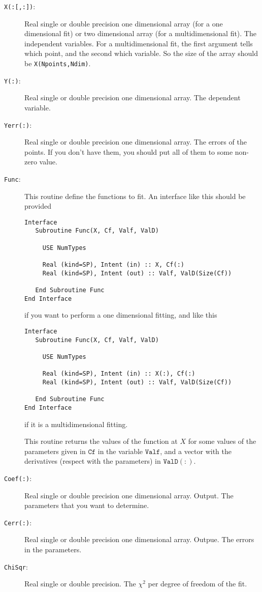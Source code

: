 \begin{description}
\item[\texttt{X(:[,:])}:] Real single or double precision one
  dimensional array (for a one dimensional fit) or two dimensional
  array (for a multidimensional fit). The
  independent variables. For a multidimensional fit, the first argument
  tells which point, and the second which variable. So the size of the
  array should be \texttt{X(Npoints,Ndim)}.
\item[\texttt{Y(:)}: ] Real single or double precision one dimensional
  array. The dependent
  variable.
\item[\texttt{Yerr(:)}:] Real single or double precision one
  dimensional array. The errors
  of the points. If you don't have them, you should put all of them to
  some non-zero value.
\item[\texttt{Func}:] This routine define the functions to
  fit. An interface like this should be provided
\begin{verbatim}
Interface
   Subroutine Func(X, Cf, Valf, ValD)
         
     USE NumTypes

     Real (kind=SP), Intent (in) :: X, Cf(:)
     Real (kind=SP), Intent (out) :: Valf, ValD(Size(Cf))
         
   End Subroutine Func
End Interface
\end{verbatim}
if you want to perform a one dimensional fitting, and like this
\begin{verbatim}
Interface
   Subroutine Func(X, Cf, Valf, ValD)
        
     USE NumTypes

     Real (kind=SP), Intent (in) :: X(:), Cf(:)
     Real (kind=SP), Intent (out) :: Valf, ValD(Size(Cf))
         
   End Subroutine Func
End Interface
\end{verbatim}
if it is a multidimensional fitting. 

This routine returns the values of the function at $X$ for some values
of the parameters given in $\mathtt{Cf}$ in the variable
$\mathtt{Valf}$, and a vector with the derivatives (respect with the
parameters) in $\mathtt{ValD(:)}$. 
\item[\texttt{Coef(:)}: ] Real single or double precision one
  dimensional array. Output. The
  parameters that you want to determine.
\item[\texttt{Cerr(:)}:] Real single or double precision one
  dimensional array. Outpue. The errors
  in the parameters.
\item[\texttt{ChiSqr}: ] Real single or double precision. The $\chi^2$
  per degree of freedom of the fit.
\end{description}

